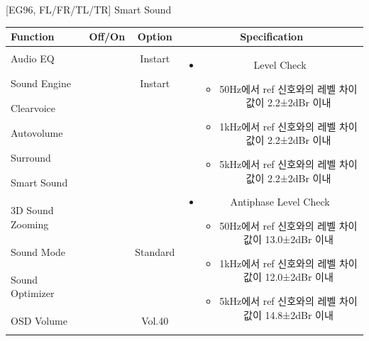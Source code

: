 \documentclass{beamer}
\begin{document}
\begin{frame}[t]{[EG96, FL/FR/TL/TR] Smart Sound}
\begin{tiny}
\begin{tabular}{@{}lccc@{}}
\toprule
Function & Off/On & Option & Specification \\
\midrule
Audio EQ & \color{black}{Off} & Instart &
\multirow{10}{60mm}{
\begin{itemize}
\item Level Check
	\begin{itemize}
	\item 50Hz에서 ref 신호와의 레벨 차이값이 2.2±2dBr 이내
	\item 1kHz에서 ref 신호와의 레벨 차이값이 2.2±2dBr 이내
	\item 5kHz에서 ref 신호와의 레벨 차이값이 2.2±2dBr 이내
	\end{itemize}
\item Antiphase Level Check
	\begin{itemize}	
	\item 50Hz에서 ref 신호와의 레벨 차이값이 13.0±2dBr 이내
	\item 1kHz에서 ref 신호와의 레벨 차이값이 12.0±2dBr 이내
	\item 5kHz에서 ref 신호와의 레벨 차이값이 14.8±2dBr 이내
	\end{itemize}
\end{itemize}
} \\
Sound Engine & \color{blue}{On} & Instart & \\
Clearvoice & \color{black}{Off} & & \\
Autovolume & \color{black}{Off} & & \\
Surround & \color{black}{Off} & & \\
Smart Sound & \color{blue}{On} & & \\
3D Sound Zooming & \color{black}{Off} & & \\
Sound Mode & \color{blue}{On} & Standard & \\
Sound Optimizer & \color{black}{Off} & & \\
OSD Volume & \color{blue}{On} & Vol.40 & \\
\midrule
\end{tabular}
\end{tiny}

\end{frame}
\end{document}

